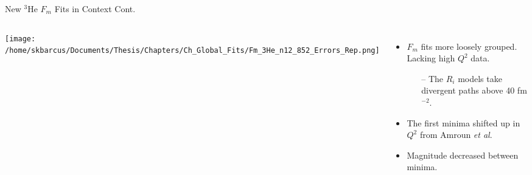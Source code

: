 \documentclass[10pt]{beamer}
\begin{document}
\begin{frame}[fragile]{New $^3$He $F_{m}$ Fits in Context Cont.}

	\begin{columns}[T,onlytextwidth]  
	
	\begin{center}
	\texttt{[image: /home/skbarcus/Documents/Thesis/Chapters/Ch\_Global\_Fits/Fm\_3He\_n12\_852\_Errors\_Rep.png]}
	\end{center}
	
	
	\begin{itemize}
		\item $F_{m}$ fits \alert{more loosely grouped}. Lacking high $Q^2$ data.
		\begin{itemize}
			\item[--] The $R_i$ models take divergent paths above 40 fm$^{-2}$.
		\end{itemize}
		\item The \alert{first minima shifted up in $Q^2$} from Amroun \textit{et al}.
		\item Magnitude decreased between minima.
	\end{itemize}
	
	\end{columns}
	

\end{frame}
\end{document}
